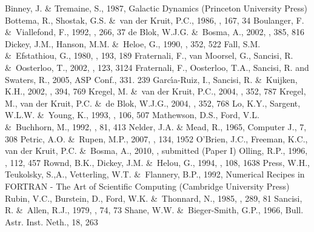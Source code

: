 \documentclass[traditabstract]{aa} %
\begin{document}

\begin{thebibliography}{}
Binney, J. \& Tremaine, S., 1987, Galactic Dynamics (Princeton
University Press)
Bottema, R., Shostak, G.S. \&\ van der Kruit, P.C., 1986, \aap, 167, 34 
Boulanger, F. \&\ Viallefond, F., 1992, \aap, 266, 37
de Blok, W.J.G. \&\ Bosma, A., 2002, \aap, 385, 816
Dickey, J.M., Hanson, M.M. \&\ Heloe, G., 1990, \apj, 352, 522
Fall, S.M. \&\ Efstathiou, G., 1980, \mnras, 193, 189
Fraternali, F., van Moorsel, G., Sancisi, R. \&\ Oosterloo, T., 2002,
\aj, 123, 3124
Fraternali, F., Oosterloo, T.A., Sancisi, R. and Swaters, R., 2005,
ASP Conf., 331.  239
Garc\'{\i}a-Ruiz, I., Sancisi, R. \&\ Kuijken, K.H., 2002, \aap, 394, 769
Kregel, M. \&\ van der Kruit, P.C., 2004, \mnras, 352, 787
Kregel, M., van der Kruit, P.C. \&\ de Blok, W.J.G., 2004, \mnras, 352, 768
Lo, K.Y., Sargent, W.L.W. \&\ Young, K., 1993, \aj, 106, 507
Mathewson, D.S., Ford, V.L. \&\ Buchhorn, M., 1992, \apjs, 81, 413 
Nelder, J.A. \& Mead, R., 1965, Computer J., 7, 308
Petric, A.O. \&\ Rupen, M.P., 2007, \aj, 134, 1952 
O'Brien, J.C., Freeman, K.C., van der Kruit, P.C. \&\ Bosma, A., 2010, \aap, submitted
(Paper I)
Olling, R.P., 1996, \aj, 112, 457
Rownd, B.K., Dickey, J.M. \&\ Helou, G., 1994, \aj, 108, 1638
Press, W.H., Teukolsky, S.,A., Vetterling, W.T. \&\ Flannery, B.P., 1992,
Numerical Recipes in FORTRAN - The Art of Scientific Computing (Cambridge
University Press) 
Rubin, V.C., Burstein, D., Ford, W.K. \&\ Thonnard, N., 1985, \apj, 289, 81
Sancisi, R. \&\ Allen, R.J., 1979, \aap, 74, 73
Shane, W.W. \&\ Bieger-Smith, G.P., 1966, Bull. Astr. Inst. Neth., 18, 263

\end{thebibliography}
\end{document}
